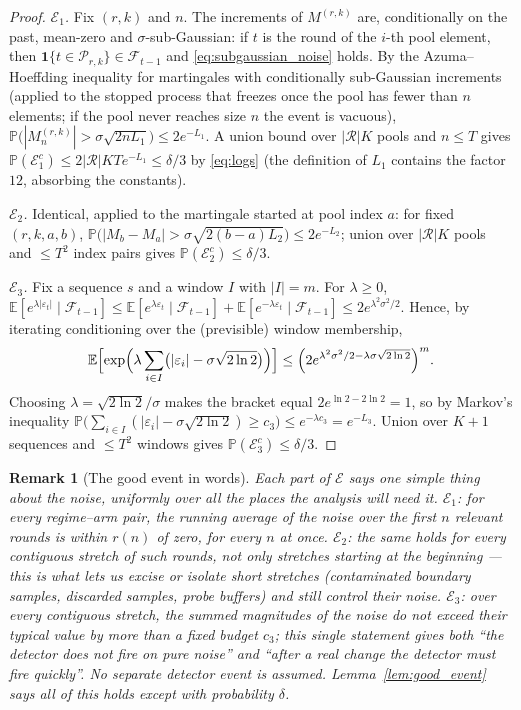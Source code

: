 \documentclass[11pt]{article}
\newtheorem{remark}{Remark}
\newcommand{\Fcal}{\mathcal F}
\newcommand{\Ecal}{\mathcal E}
\newcommand{\Pcal}{\mathcal P}
\newcommand{\Rcal}{\mathcal R}
\newcommand{\E}{\mathbb E}
\newcommand{\Pbb}{\mathbb P}
\newcommand{\one}{\mathbf 1}
\begin{document}
\begin{proof}
\emph{$\Ecal_1$.} Fix $(r,k)$ and $n$. The increments of $M^{(r,k)}$ are, conditionally on the past, mean-zero and $\sigma$-sub-Gaussian: if $t$ is the round of the $i$-th pool element, then $\one\{t\in\Pcal_{r,k}\}\in\Fcal_{t-1}$ and \eqref{eq:subgaussian_noise} holds. By the Azuma--Hoeffding inequality for martingales with conditionally sub-Gaussian increments (applied to the stopped process that freezes once the pool has fewer than $n$ elements; if the pool never reaches size $n$ the event is vacuous),
$\Pbb\bigl(|M^{(r,k)}_n|>\sigma\sqrt{2nL_1}\bigr)\le 2e^{-L_1}$.
A union bound over $|\Rcal|K$ pools and $n\le T$ gives
$\Pbb(\Ecal_1^c)\le 2|\Rcal|KT e^{-L_1}\le\delta/3$ by \eqref{eq:logs} (the definition of $L_1$ contains the factor $12$, absorbing the constants).

\emph{$\Ecal_2$.} Identical, applied to the martingale started at pool index $a$: for fixed $(r,k,a,b)$, $\Pbb\bigl(|M_b-M_a|>\sigma\sqrt{2(b-a)L_2}\bigr)\le2e^{-L_2}$; union over $|\Rcal|K$ pools and $\le T^2$ index pairs gives $\Pbb(\Ecal_2^c)\le\delta/3$.

\emph{$\Ecal_3$.} Fix a sequence $s$ and a window $I$ with $|I|=m$. For $\lambda\ge0$,
$\E[e^{\lambda|\varepsilon_t|}\mid\Fcal_{t-1}]\le\E[e^{\lambda\varepsilon_t}\mid\Fcal_{t-1}]+\E[e^{-\lambda\varepsilon_t}\mid\Fcal_{t-1}]\le2e^{\lambda^2\sigma^2/2}$.
Hence, by iterating conditioning over the (previsible) window membership,
\[
\E\Bigl[\exp\Bigl(\lambda\sum_{i\in I}\bigl(|\varepsilon_i|-\sigma\sqrt{2\ln2}\bigr)\Bigr)\Bigr]
\le\Bigl(2e^{\lambda^2\sigma^2/2-\lambda\sigma\sqrt{2\ln2}}\Bigr)^{m}.
\]
Choosing $\lambda=\sqrt{2\ln2}/\sigma$ makes the bracket equal $2e^{\ln2-2\ln2}=1$, so by Markov's inequality
$\Pbb\bigl(\sum_{i\in I}(|\varepsilon_i|-\sigma\sqrt{2\ln2})\ge c_3\bigr)\le e^{-\lambda c_3}=e^{-L_3}$.
Union over $K{+}1$ sequences and $\le T^2$ windows gives $\Pbb(\Ecal_3^c)\le\delta/3$.
\end{proof}

\begin{remark}[The good event in words]
Each part of $\Ecal$ says one simple thing about the noise, uniformly over all the places the analysis will need it. $\Ecal_1$: for every regime--arm pair, the running average of the noise over the first $n$ relevant rounds is within $r(n)$ of zero, for every $n$ at once. $\Ecal_2$: the same holds for every \emph{contiguous stretch} of such rounds, not only stretches starting at the beginning --- this is what lets us excise or isolate short stretches (contaminated boundary samples, discarded samples, probe buffers) and still control their noise. $\Ecal_3$: over every contiguous stretch, the summed \emph{magnitudes} of the noise do not exceed their typical value by more than a fixed budget $c_3$; this single statement gives both ``the detector does not fire on pure noise'' and ``after a real change the detector must fire quickly''. No separate detector event is assumed. Lemma~\ref{lem:good_event} says all of this holds except with probability $\delta$.
\end{remark}
\end{document}
